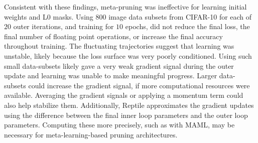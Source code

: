 \documentclass{article}
\begin{document}
Consistent with these findings, meta-pruning was ineffective for learning initial weights and L0 masks. Using $800$ image data subsets from CIFAR-10 for each of $20$ outer iterations, and training for $10$ epochs, did not reduce the final loss, the final number of floating point operations, or increase the final accuracy throughout training. The fluctuating trajectories suggest that learning was unstable, likely because the loss surface was very poorly conditioned. Using such small data-subsets likely gave a very weak gradient signal during the outer update and learning was unable to make meaningful progress. Larger data-subsets could increase the gradient signal, if more computational resources were available. Averaging the gradient signals or applying a momentum term could also help stabilize them.  Additionally, Reptile approximates the gradient updates using the difference between the final inner loop parameters and the outer loop parameters. Computing these more precisely, such as with MAML, may be necessary for meta-learning-based pruning architectures. 
\end{document}
